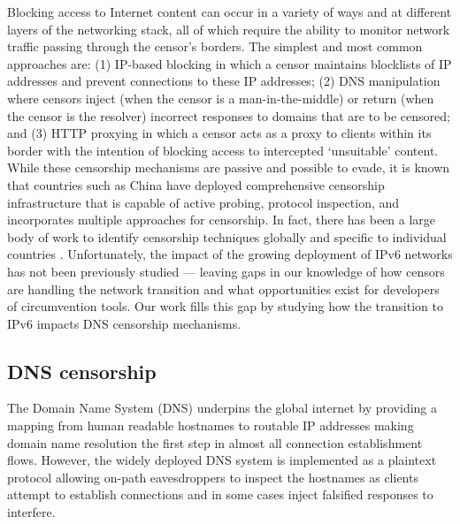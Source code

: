%
Blocking access to Internet content can occur in a variety of ways and at
different layers of the networking stack, all of which require the ability to
monitor network traffic passing through the censor's borders. The simplest and
most common approaches are: (1) IP-based blocking in which a censor maintains
blocklists of IP addresses and prevent connections to these IP addresses; (2)
DNS manipulation where censors inject (when the censor is a man-in-the-middle)
or return (when the censor is the resolver) incorrect responses to domains that
are to be censored; and (3) HTTP proxying in which a censor acts as a proxy to
clients within its border with the intention of blocking access to intercepted
`unsuitable' content. 
%
While these censorship mechanisms are passive and possible to evade, it is
known that countries such as China have deployed comprehensive censorship
infrastructure that is capable of active probing, protocol inspection, and
incorporates multiple approaches for censorship.
%
In fact, there has been a large body of work to identify censorship techniques
globally
\cite{pearce2017global, niaki2020iclab, scott2016satellite,
sundara2020censored, filasto2012ooni, pearce2017augur, razaghpanah2016exploring}
and specific to individual countries \cite{USESEC21:GFWatch, aryan2013internet,
ramesh2020decentralized, yadav2018light, gebhart2017internet, nabi2013anatomy}.
%
Unfortunately, the impact of the growing deployment of IPv6 networks has not
been previously studied --- leaving gaps in our knowledge of how censors are
handling the network transition and what opportunities exist for developers of
circumvention tools. Our work fills this gap by studying how the transition to
IPv6 impacts DNS censorship mechanisms.

\subsection{DNS censorship}\label{sec:v4vsv6-background:dns}


The Domain Name System (DNS) underpins the global internet by providing
a mapping from human readable hostnames to routable IP addresses making domain
name resolution the first step in almost all connection establishment flows.
However, the widely deployed DNS system is implemented as a plaintext protocol
allowing on-path eavesdroppers to inspect the hostnames as clients attempt to
establish connections and in some cases inject falsified responses to interfere.


